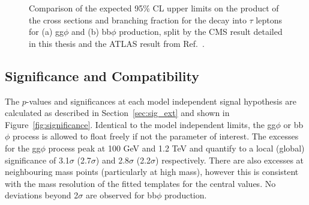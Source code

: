 \begin{figure}[!hbtp]
\centering
\caption{Comparison of the expected 95\% CL upper limits on the product of the cross sections and branching fraction for the decay into $\tau$ leptons for (a) gg$\phi$ and (b) bb$\phi$ production, split by the CMS result detailed in this thesis and the ATLAS result from Ref.~\cite{ATLAS:2020zms}.}
\label{fig:model_independent_limits_ATLAS}
\end{figure}

\subsection{Significance and Compatibility}

The $p$-values and significances at each model independent signal hypothesis are calculated as described in Section~\ref{sec:sig_ext} and shown in Figure~\ref{fig:significance}.
Identical to the model independent limits, the gg$\phi$ or bb$\phi$ process is allowed to float freely if not the parameter of interest.
The excesses for the gg$\phi$ process peak at 100 GeV and 1.2 TeV and quantify to a local (global) significance of 3.1$\sigma$ (2.7$\sigma$) and 2.8$\sigma$ (2.2$\sigma$) respectively.
There are also excesses at neighbouring mass points (particularly at high mass), however this is consistent with the mass resolution of the fitted templates for the central values.
No deviations beyond 2$\sigma$ are observed for bb$\phi$ production. \\

